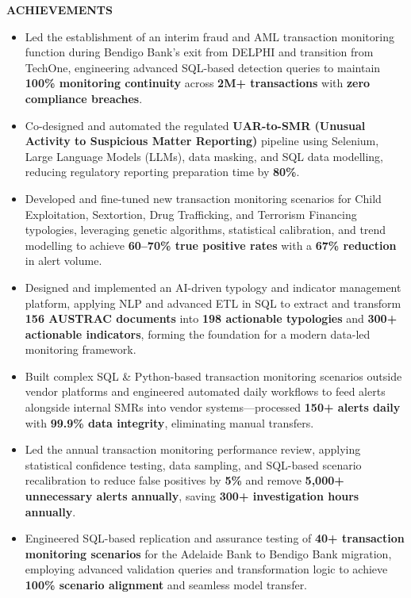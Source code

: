 \documentclass[11pt,a4paper]{article}
\begin{document}
\begin{mdframed}[style=dashedleft]
\textbf{ACHIEVEMENTS}
\begin{itemize}[leftmargin=1.5em, itemsep=4pt]
    \item Led the establishment of an interim fraud and AML transaction monitoring function during Bendigo Bank’s exit from DELPHI and transition from TechOne, engineering advanced SQL-based detection queries to maintain \textbf{100\% monitoring continuity} across \textbf{2M+ transactions} with \textbf{zero compliance breaches}.
    \item Co-designed and automated the regulated \textbf{UAR-to-SMR (Unusual Activity to Suspicious Matter Reporting)} pipeline using Selenium, Large Language Models (LLMs), data masking, and SQL data modelling, reducing regulatory reporting preparation time by \textbf{80\%}.
    \item Developed and fine-tuned new transaction monitoring scenarios for Child Exploitation, Sextortion, Drug Trafficking, and Terrorism Financing typologies, leveraging genetic algorithms, statistical calibration, and trend modelling to achieve \textbf{60--70\% true positive rates} with a \textbf{67\% reduction} in alert volume.
    \item Designed and implemented an AI-driven typology and indicator management platform, applying NLP and advanced ETL in SQL to extract and transform \textbf{156 AUSTRAC documents} into \textbf{198 actionable typologies} and \textbf{300+ actionable indicators}, forming the foundation for a modern data-led monitoring framework.
    \item Built complex SQL \& Python-based transaction monitoring scenarios outside vendor platforms and engineered automated daily workflows to feed alerts alongside internal SMRs into vendor systems—processed \textbf{150+ alerts daily} with \textbf{99.9\% data integrity}, eliminating manual transfers.
    \item Led the annual transaction monitoring performance review, applying statistical confidence testing, data sampling, and SQL-based scenario recalibration to reduce false positives by \textbf{5\%} and remove \textbf{5,000+ unnecessary alerts annually}, saving \textbf{300+ investigation hours annually}.
    \item Engineered SQL-based replication and assurance testing of \textbf{40+ transaction monitoring scenarios} for the Adelaide Bank to Bendigo Bank migration, employing advanced validation queries and transformation logic to achieve \textbf{100\% scenario alignment} and seamless model transfer.


\end{itemize}
\end{mdframed}
\end{document}
